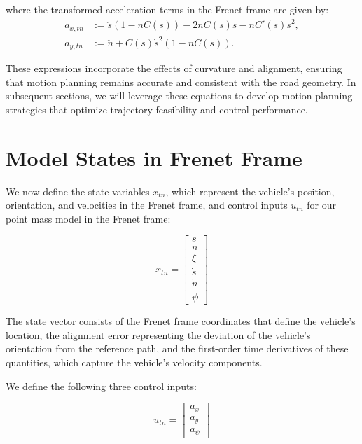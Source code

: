 where the transformed acceleration terms in the Frenet frame are given by:
\begin{align}
	a_{x,tn} & := \ddot{s}(1 - nC(s)) - 2\dot{n}
	C(s)\dot{s} - nC'(s)\dot{s}^2, \label{def:axtn} \\ a_{y,tn} & := \ddot{n} + C(s)\dot{s}^2(1 - nC(s)).
	   \label{def:aytn}
\end{align}

These expressions incorporate the effects of curvature and alignment, ensuring that motion planning remains accurate and consistent with the road
geometry.
In subsequent sections, we will leverage these equations to develop motion planning strategies that optimize trajectory feasibility and control
performance.

\section{Model States in Frenet Frame}

We now define the state variables $x_{tn}$, which represent the vehicle's position, orientation, and velocities in the Frenet frame, and control inputs $u_{tn}$ for our point mass model in the Frenet frame:

\begin{equation}
	x_{tn} = \begin{bmatrix}
		s       \\
		n       \\
		\xi     \\
		\dot{s} \\
		\dot{n} \\
		\dot{\psi}
	\end{bmatrix}
\end{equation}

The state vector consists of the Frenet frame coordinates that define the vehicle's location, the alignment error representing the deviation of the
vehicle's orientation from the reference path, and the first-order time derivatives of these quantities, which capture the vehicle's velocity
components.

We define the following three control inputs:

\begin{equation}
	u_{tn} = \begin{bmatrix}
		a_{x} \\
		a_{y} \\
		a_\psi
	\end{bmatrix}
\end{equation}

